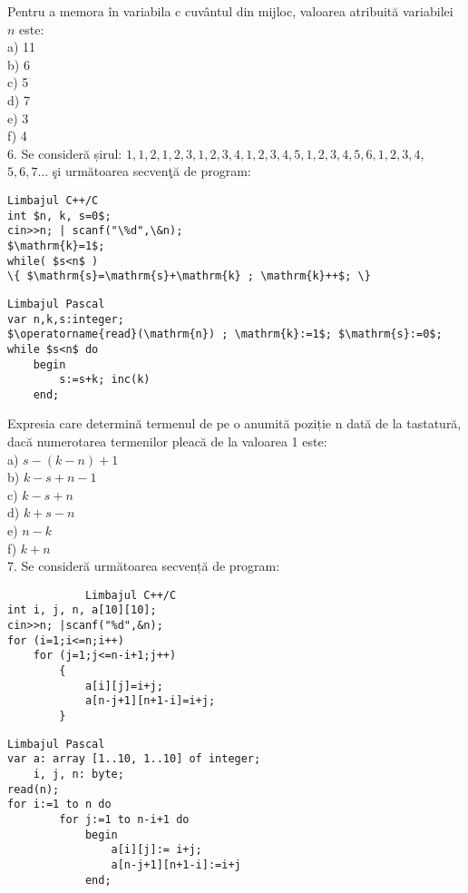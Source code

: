 Pentru a memora în variabila c cuvântul din mijloc, valoarea atribuită variabilei $n$ este:\\
a) 11\\
b) 6\\
c) 5\\
d) 7\\
e) 3\\
f) 4\\
6. Se consideră șirul: $1,1,2,1,2,3,1,2,3,4,1,2,3,4,5,1,2,3,4,5,6,1,2,3,4$, $5,6,7 \ldots$ şi următoarea secvenţă de program:

\begin{verbatim}
Limbajul C++/C
int $n, k, s=0$;
cin>>n; | scanf("\%d",\&n);
$\mathrm{k}=1$;
while( $s<n$ )
\{ $\mathrm{s}=\mathrm{s}+\mathrm{k} ; \mathrm{k}++$; \}
\end{verbatim}

\begin{verbatim}
Limbajul Pascal
var n,k,s:integer;
$\operatorname{read}(\mathrm{n}) ; \mathrm{k}:=1$; $\mathrm{s}:=0$;
while $s<n$ do
    begin
        s:=s+k; inc(k)
    end;
\end{verbatim}

Expresia care determină termenul de pe o anumită poziție n dată de la tastatură, dacă numerotarea termenilor pleacă de la valoarea 1 este:\\
a) $s-(k-n)+1$\\
b) $k-s+n-1$\\
c) $k-s+n$\\
d) $k+s-n$\\
e) $n-k$\\
f) $k+n$\\
7. Se consideră următoarea secvență de program:

\begin{verbatim}
            Limbajul C++/C
int i, j, n, a[10][10];
cin>>n; |scanf("%d",&n);
for (i=1;i<=n;i++)
    for (j=1;j<=n-i+1;j++)
        {
            a[i][j]=i+j;
            a[n-j+1][n+1-i]=i+j;
        }
\end{verbatim}

\begin{verbatim}
Limbajul Pascal
var a: array [1..10, 1..10] of integer;
    i, j, n: byte;
read(n);
for i:=1 to n do
        for j:=1 to n-i+1 do
            begin
                a[i][j]:= i+j;
                a[n-j+1][n+1-i]:=i+j
            end;
\end{verbatim}

